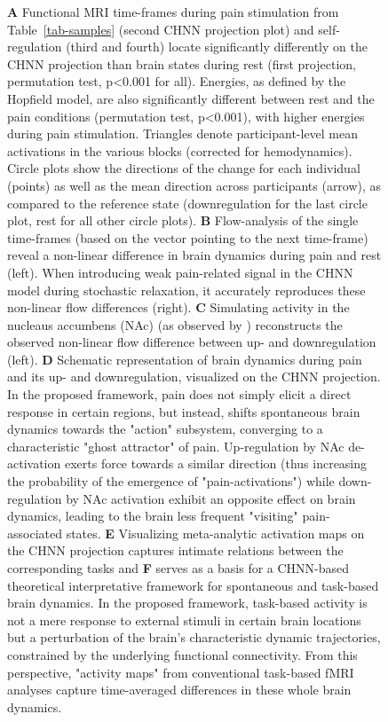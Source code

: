 \documentclass{article}
\begin{document}
\begin{figure}[!htbp]
{\textbf{A} Functional MRI time-frames during pain stimulation from Table~\ref{tab-samples} (second CHNN projection plot)
and self-regulation (third and fourth) locate significantly differently on the CHNN projection than brain states
during rest (first projection, permutation test, p\textless 0.001 for all).  Energies, as defined by the Hopfield model, are also
significantly different between rest and the pain conditions (permutation test, p\textless 0.001), with higher energies during
pain stimulation. Triangles denote participant-level mean activations in the various blocks (corrected for
hemodynamics). Circle plots show the directions of the change for each individual (points) as well as the mean direction
across participants (arrow), as compared to the reference state (downregulation for the last circle plot, rest for all
other circle plots).
\textbf{B} Flow-analysis of the single time-frames (based on the vector pointing to the next time-frame)
reveal a non-linear difference in brain dynamics during pain and rest (left). When introducing weak
pain-related signal in the CHNN model during stochastic relaxation, it accurately reproduces these non-linear flow
differences (right).
\textbf{C} Simulating activity in the nucleaus accumbens (NAc) (as observed by \cite{woo2015distinct}) reconstructs the observed non-linear flow difference between up- and downregulation (left).
\textbf{D} Schematic representation of brain dynamics during pain and its up- and downregulation, visualized on the CHNN
projection. In the proposed framework, pain does not simply elicit a direct response in certain regions, but instead, shifts spontaneous brain dynamics towards the "action" subsystem, converging to a characteristic "ghost
attractor" of pain. Up-regulation by NAc de-activation exerts force towards a similar direction (thus increasing the probability of the emergence of "pain-activations") while down-regulation
by NAc activation exhibit an opposite effect on brain dynamics, leading to the brain less frequent "visiting"
pain-associated states.
\textbf{E} Visualizing meta-analytic activation maps on the CHNN projection captures intimate relations between the corresponding tasks and \textbf{F} serves as a basis for a CHNN-based theoretical interpretative framework for spontaneous and task-based brain dynamics. In the proposed framework, task-based activity is not a mere response to external stimuli in certain brain locations but a perturbation of the brain's characteristic dynamic trajectories, constrained by the underlying functional connectivity. From this perspective, "activity maps" from conventional task-based fMRI analyses capture time-averaged differences in these whole brain dynamics.}
\label{task-validity}
\end{figure}
\end{document}
